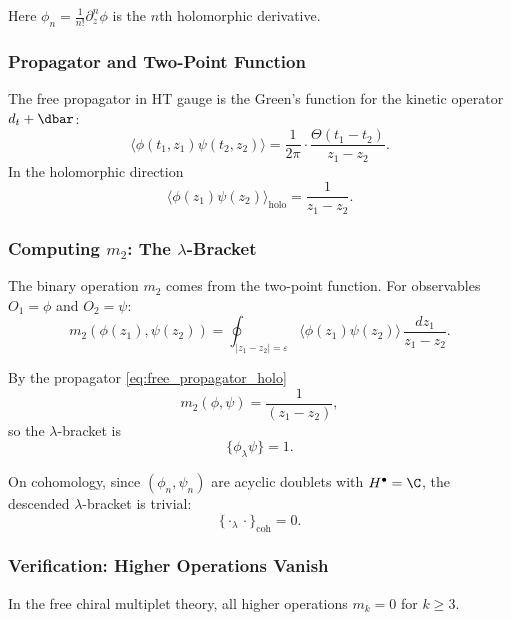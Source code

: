 Here $\phi_n = \frac{1}{n!} \partial_z^n \phi$ is the $n$th holomorphic derivative.
\subsubsection{Propagator and Two-Point Function}
The free propagator in HT gauge is the Green's function for the kinetic operator $d_t + \dbar$:
\begin{equation}
\label{eq:free_propagator}
\langle \phi(t_1, z_1) \psi(t_2, z_2) \rangle = \frac{1}{2\pi} \cdot \frac{\Theta(t_1 - t_2)}{z_1 - z_2}.
\end{equation}
In the holomorphic direction
\begin{equation}
\label{eq:free_propagator_holo}
\langle \phi(z_1) \psi(z_2) \rangle_{\text{holo}} = \frac{1}{z_1 - z_2}.
\end{equation}

\subsubsection{Computing $m_2$: The $\lambda$-Bracket}
The binary operation $m_2$ comes from the two-point function. For observables $O_1 = \phi$ and $O_2 = \psi$:
\begin{equation}
m_2(\phi(z_1), \psi(z_2)) = \oint_{|z_1 - z_2| = \varepsilon} \langle \phi(z_1) \psi(z_2) \rangle \, \frac{dz_1}{z_1 - z_2}.
\end{equation}

By the propagator \eqref{eq:free_propagator_holo}
\begin{equation}
m_2(\phi, \psi) = \frac{1}{(z_1 - z_2)},
\end{equation}
so the $\lambda$-bracket is
\begin{equation}
\label{eq:free_lambda_bracket}
\{\phi_\lambda \psi\} = 1.
\end{equation}

On cohomology, since $(\phi_n, \psi_n)$ are acyclic doublets with $H^\bullet = \C$, the descended $\lambda$-bracket is trivial:
\begin{equation}
\{\cdot_\lambda \cdot\}_{\text{coh}} = 0.
\end{equation}

\subsubsection{Verification: Higher Operations Vanish}

\begin{proposition}[All $m_{k \geq 3} = 0$ for Free Theory]
\label{prop:free_higher_vanish}
In the free chiral multiplet theory, all higher operations $m_k = 0$ for $k \geq 3$.
\end{proposition}

